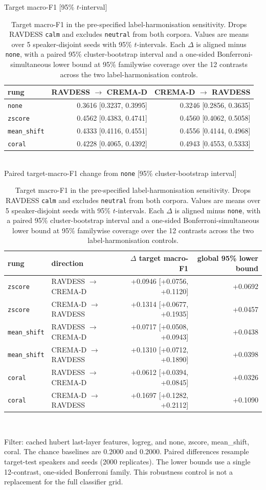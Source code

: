 \begin{table}[!t]
  \centering
  \caption{Target macro-F1 in the pre-specified label-harmonisation sensitivity. Drops RAVDESS \texttt{calm} and excludes \texttt{neutral} from both corpora. Values are means over 5 speaker-disjoint seeds with 95\% $t$-intervals. Each $\Delta$ is aligned minus \texttt{none}, with a paired 95\% cluster-bootstrap interval and a one-sided Bonferroni-simultaneous lower bound at 95\% familywise coverage over the 12 contrasts across the two label-harmonisation controls.}
  \label{tab:neutral-excluded-sensitivity}
  \small
  Target macro-F1 [95\% $t$-interval]\\[2pt]
  \begin{tabular}{lrr}
    \toprule
    rung & RAVDESS $\rightarrow$ CREMA-D & CREMA-D $\rightarrow$ RAVDESS \\
    \midrule
    \texttt{none} & 0.3616 [0.3237, 0.3995] & 0.3246 [0.2856, 0.3635] \\
    \texttt{zscore} & 0.4562 [0.4383, 0.4741] & 0.4560 [0.4062, 0.5058] \\
    \texttt{mean\_shift} & 0.4333 [0.4116, 0.4551] & 0.4556 [0.4144, 0.4968] \\
    \texttt{coral} & 0.4228 [0.4065, 0.4392] & 0.4943 [0.4553, 0.5333] \\
    \bottomrule
  \end{tabular}
  \\[5pt]
  Paired target-macro-F1 change from \texttt{none} [95\% cluster-bootstrap interval]\\[2pt]
  \begin{tabular}{llrr}
    \toprule
    rung & direction & $\Delta$ target macro-F1 & global 95\% lower bound \\
    \midrule
    \texttt{zscore} & RAVDESS $\rightarrow$ CREMA-D & +0.0946 [+0.0756, +0.1120] & +0.0692 \\
    \texttt{zscore} & CREMA-D $\rightarrow$ RAVDESS & +0.1314 [+0.0677, +0.1935] & +0.0457 \\
    \texttt{mean\_shift} & RAVDESS $\rightarrow$ CREMA-D & +0.0717 [+0.0508, +0.0943] & +0.0438 \\
    \texttt{mean\_shift} & CREMA-D $\rightarrow$ RAVDESS & +0.1310 [+0.0712, +0.1890] & +0.0398 \\
    \texttt{coral} & RAVDESS $\rightarrow$ CREMA-D & +0.0612 [+0.0394, +0.0845] & +0.0326 \\
    \texttt{coral} & CREMA-D $\rightarrow$ RAVDESS & +0.1697 [+0.1282, +0.2112] & +0.1090 \\
    \bottomrule
  \end{tabular}
  \\[2pt]
  \begin{minipage}{\linewidth}\footnotesize Filter: cached hubert last-layer features, logreg, and none, zscore, mean\_shift, coral. The chance baselines are 0.2000 and 0.2000. Paired differences resample target-test speakers and seeds (2000 replicates). The lower bounds use a single 12-contrast, one-sided Bonferroni family. This robustness control is not a replacement for the full classifier grid.\end{minipage}
\end{table}
